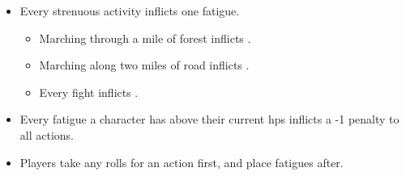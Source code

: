 \begin{itemize}
  \item
  Every strenuous activity inflicts one \gls{fatigue}.
  \begin{itemize}
    \item
    Marching through a mile of forest inflicts .
    \item
    Marching along two miles of road inflicts .
    \item
    Every fight inflicts .
  \end{itemize}
  \item
  Every \gls{fatigue} a character has above their current \glspl{hp} inflicts a -1 penalty to all actions.
  \item
  Players take any rolls for an action first, and place \glspl{fatigue} after.
\end{itemize}
